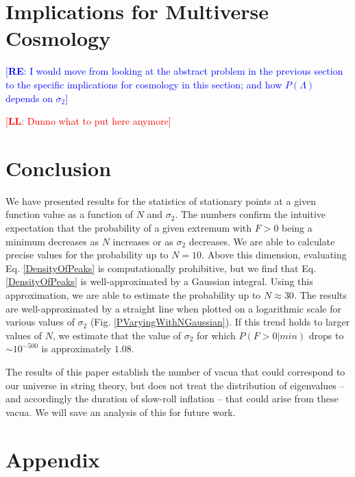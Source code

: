 \documentclass[12pt]{article}
\newcommand{\re}[1]{\textcolor{blue}{[{\bf RE}: #1]}}
\newcommand{\lfl}[1]{\textcolor{red}{[{\bf LL}: #1]}}
\begin{document}

\section{Implications for Multiverse Cosmology}

\re{I would move from looking at the abstract problem in the previous section to the specific implications for cosmology in this section; and how $P(\Lambda)$ depends on $\sigma_2$}

\lfl{Dunno what to put here anymore}

\section{Conclusion}
We have presented results for the statistics of stationary points at a given function value as a function of $N$ and $\sigma_2$. The numbers confirm the intuitive expectation that the probability of a given extremum with $F > 0$ being a minimum decreases as $N$ increases or as $\sigma_2$ decreases. We are able to calculate precise values for the probability up to $N=10$. Above this dimension, evaluating Eq. \ref{DensityOfPeaks} is computationally prohibitive, but we find that Eq. \ref{DensityOfPeaks} is well-approximated by a Gaussian integral. Using this approximation, we are able to estimate the probability up to $N \approx 30$. The results are well-approximated by a straight line when plotted on a logarithmic scale for various values of $\sigma_2$ (Fig. \ref{PVaryingWithNGaussian}). If this trend holds to larger values of $N$, we estimate that the value of $\sigma_2$ for which $P(F>0|min)$ drops to $\sim 10^{-500}$ is approximately $1.08$.

The results of this paper establish the number of vacua that could correspond to our universe in string theory, but does not treat the distribution of eigenvalues -- and accordingly the duration of slow-roll inflation -- that could arise from these vacua. We will save an analysis of this for future work.

\section{Appendix}
\end{document}
